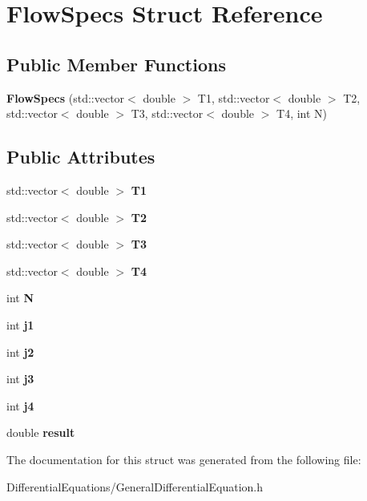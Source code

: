 \hypertarget{structFlowSpecs}{}\section{Flow\+Specs Struct Reference}
\label{structFlowSpecs}
\subsection*{Public Member Functions}
\begin{DoxyCompactItemize}
\item 
\mbox{\label{structFlowSpecs_a4afc47d62dc346f382b3bcb26440642f}} 
{\bfseries Flow\+Specs} (std\+::vector$<$ double $>$ T1, std\+::vector$<$ double $>$ T2, std\+::vector$<$ double $>$ T3, std\+::vector$<$ double $>$ T4, int N)
\end{DoxyCompactItemize}
\subsection*{Public Attributes}
\begin{DoxyCompactItemize}
\item 
\mbox{\label{structFlowSpecs_a5a27437ab644c00f64f92071a2f76856}} 
std\+::vector$<$ double $>$ {\bfseries T1}
\item 
\mbox{\label{structFlowSpecs_a8fd50e0322b69a2122ce3928fcc3c0aa}} 
std\+::vector$<$ double $>$ {\bfseries T2}
\item 
\mbox{\label{structFlowSpecs_a93d29e97f0c611a8dcfd929de06606d3}} 
std\+::vector$<$ double $>$ {\bfseries T3}
\item 
\mbox{\label{structFlowSpecs_a1aa0d8d815aec2e1a754d518bc3ffa5e}} 
std\+::vector$<$ double $>$ {\bfseries T4}
\item 
\mbox{\label{structFlowSpecs_ac4ffae186508f9eba2b027f5bb2e9617}} 
int {\bfseries N}
\item 
\mbox{\label{structFlowSpecs_a2eea620572185c537a33ac2e4e63d57e}} 
int {\bfseries j1}
\item 
\mbox{\label{structFlowSpecs_a1af5426798d95ccb302e7304c4b9cdbe}} 
int {\bfseries j2}
\item 
\mbox{\label{structFlowSpecs_a7d4ddd5f7fb9974282eb49d12a9e7388}} 
int {\bfseries j3}
\item 
\mbox{\label{structFlowSpecs_ab41aa036402a0684acfd20dc340e8481}} 
int {\bfseries j4}
\item 
\mbox{\label{structFlowSpecs_a4b30677d87454530a327bce3ec97d2ca}} 
double {\bfseries result}
\end{DoxyCompactItemize}


The documentation for this struct was generated from the following file\+:\begin{DoxyCompactItemize}
\item 
Differential\+Equations/General\+Differential\+Equation.\+h\end{DoxyCompactItemize}
